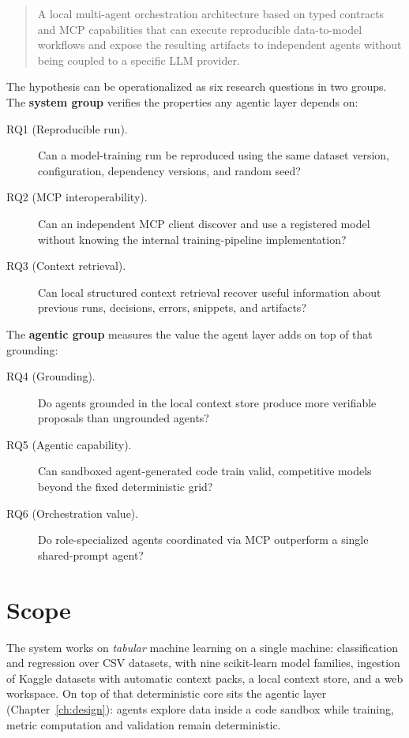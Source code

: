 \begin{quote}
	A local multi-agent orchestration architecture based on typed contracts and MCP capabilities that can execute reproducible data-to-model workflows and expose the resulting artifacts to independent agents without being coupled to a specific LLM provider.
\end{quote}

The hypothesis can be operationalized as six research questions in two groups. The \textbf{system group} verifies the properties any agentic layer depends on:

\begin{description}
	\item[RQ1 (Reproducible run).] Can a model-training run be reproduced using the same dataset version, configuration, dependency versions, and random seed?
	\item[RQ2 (MCP interoperability).] Can an independent MCP client discover and use a registered model without knowing the internal training-pipeline implementation?
	\item[RQ3 (Context retrieval).] Can local structured context retrieval recover useful information about previous runs, decisions, errors, snippets, and artifacts?
\end{description}

The \textbf{agentic group} measures the value the agent layer adds on top of that grounding:

\begin{description}
	\item[RQ4 (Grounding).] Do agents grounded in the local context store produce more verifiable proposals than ungrounded agents?
	\item[RQ5 (Agentic capability).] Can sandboxed agent-generated code train valid, competitive models beyond the fixed deterministic grid?
	\item[RQ6 (Orchestration value).] Do role-specialized agents coordinated via MCP outperform a single shared-prompt agent?
\end{description}


\section{Scope}
\label{sec:scope}

The system works on \emph{tabular} machine learning on a single machine: classification and regression over CSV datasets, with nine scikit-learn model families, ingestion of Kaggle datasets with automatic context packs, a local context store, and a web workspace. On top of that deterministic core sits the agentic layer (Chapter~\ref{ch:design}): agents explore data inside a code sandbox while training, metric computation and validation remain deterministic.

